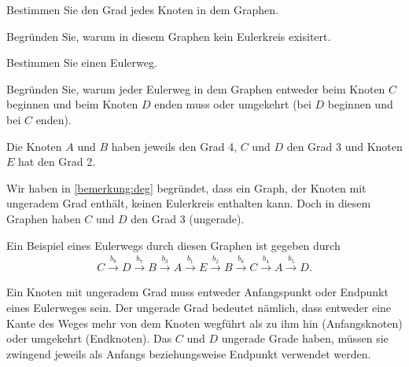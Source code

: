 \clearpage
\begin{myexercise}\label{myexercise:06}
	\begin{figure}[H]
		\centering
	\end{figure}
	\begin{aenum}
		\item Bestimmen Sie den Grad jedes Knoten in dem Graphen.
		\item Begründen Sie, warum in diesem Graphen kein Eulerkreis exisitert.
		\item Bestimmen Sie einen Eulerweg.
		\item Begründen Sie, warum jeder Eulerweg in dem Graphen entweder beim Knoten $C$ beginnen und beim Knoten $D$ enden muss oder umgekehrt (bei $D$ beginnen und bei $C$ enden).
	\end{aenum}
	\begin{myanswer}\label{myexercise:06-sol}
		\begin{aenum}
			\item Die Knoten $A$ und $B$ haben jeweils den Grad 4, $C$ und $D$ den Grad 3 und Knoten $E$ hat den Grad 2.
			\item Wir haben in \cref{bemerkung:deg} begründet, dass ein Graph, der Knoten mit ungeradem Grad enthält, keinen Eulerkreis enthalten kann. Doch in diesem Graphen haben $C$ und $D$ den Grad 3 (ungerade).
			\item Ein Beispiel eines Eulerwegs durch diesen Graphen ist gegeben durch
			\begin{align*}
				C \stackrel{b_8}{\longrightarrow} D \stackrel{b_7}{\longrightarrow} B \stackrel{b_3}{\longrightarrow} A \stackrel{b_1}{\longrightarrow} E \stackrel{b_2}{\longrightarrow} B \stackrel{b_6}{\longrightarrow} C
				\stackrel{b_4}{\longrightarrow} A \stackrel{b_5}{\longrightarrow} D.
			\end{align*}
			\item Ein Knoten mit ungeradem Grad muss entweder Anfangspunkt oder Endpunkt eines Eulerweges sein. Der ungerade Grad bedeutet nämlich, dass entweder eine Kante des Weges mehr von dem Knoten wegführt als zu ihm hin (Anfangsknoten) oder umgekehrt (Endknoten). Das $C$ und $D$ ungerade Grade haben, müssen sie zwingend jeweils als Anfangs beziehungsweise Endpunkt verwendet werden.
		\end{aenum}
	\end{myanswer}
\end{myexercise}



